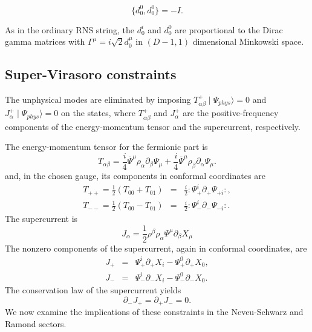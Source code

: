 \documentclass[a4paper,a4paper]{article}
\begin{document}
\begin{equation}
\{d_{0}^{0}, d_{0}^{0}\}=-I.
\end{equation}

As in the ordinary RNS string, the $d_{0}^{i}$ and $d_{0}^{0}$ are
proportional to the Dirac gamma matrices with $\Gamma^{\mu} = i
\sqrt{2} d^{\mu}_0 $ in $(D-1,1)$ dimensional Minkowski space.

\subsection{Super-Virasoro constraints}

The unphysical modes are eliminated by imposing
$T^{+}_{\alpha\beta}\mid\Psi_{phys}\rangle=0$ and
$J^{+}_{\alpha}\mid\Psi_{phys}\rangle=0$ on the states, where
$T^{+}_{\alpha\beta}$ and $J^{+}_{\alpha}$ are the
positive-frequency components of the energy-momentum tensor and
the supercurrent, respectively.

The energy-momentum tensor for the fermionic part is
\begin{equation}
T_{\alpha\beta}=\frac{i}{4}\bar{\Psi}^{\mu}\rho_{\alpha}\partial_{\beta}\Psi_{\mu}+\frac{i}{4}\bar{\Psi}^{\mu}\rho_{\beta}\partial_{\alpha}\Psi_{\mu}.
\end{equation}
and, in the chosen gauge, its components in conformal coordinates
are
\begin{eqnarray}
T_{++}=\frac{1}{2}(T_{00}+T_{01})&=&\frac{i}{2}:\Psi_{+}^{i}\partial_{+}\Psi_{+i}:,\\
T_{--}=\frac{1}{2}(T_{00}-T_{01})&=&\frac{i}{2}:\Psi_{-}^{i}\partial_{-}\Psi_{-i}:.
\end{eqnarray}
The supercurrent is
\begin{equation}
J_{\alpha}=\frac{1}{2}\rho^{\beta}\rho_{\alpha}\Psi^{\mu}\partial_{\beta}X_{\mu}
\end{equation}
The nonzero components of the supercurrent, again in conformal
coordinates, are
\begin{eqnarray}
J_{+}&=&\Psi_{+}^{i}\partial_{+}X_{i}-\Psi_{+}^{0}\partial_{+}X_{0},\\
J_{-}&=&\Psi_{-}^{i}\partial_{-}X_{i}-\Psi_{-}^{0}\partial_{-}X_{0}.
\end{eqnarray}
The conservation law of the supercurrent yields
\begin{equation}
\partial_{-}J_{+}=\partial_{+}J_{-}=0.
\end{equation}
We now examine the implications of these constraints in the
Neveu-Schwarz and Ramond sectors.
\end{document}
